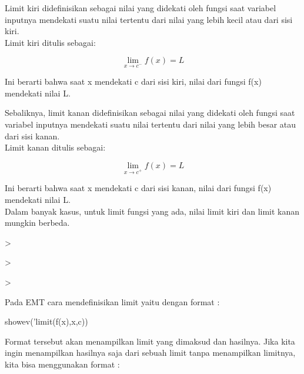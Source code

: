 \documentclass[a4paper,10pt]{article}
\begin{document}
\begin{eulernotebook}
\begin{eulercomment}
\begin{eulercomment}
\begin{eulercomment}
\begin{eulercomment}
\begin{eulercomment}
\begin{eulercomment}
\begin{eulercomment}
Limit kiri didefinisikan sebagai nilai yang didekati oleh fungsi saat
variabel inputnya mendekati suatu nilai tertentu dari nilai yang lebih
kecil atau dari sisi kiri.\\
Limit kiri ditulis sebagai:

\end{eulercomment}
\begin{eulerformula}
\[
\lim \limits_{x \to c^-} {f(x)} = L
\]
\end{eulerformula}
\begin{eulercomment}
Ini berarti bahwa saat x mendekati c dari sisi kiri, nilai dari fungsi
f(x) mendekati nilai L.


Sebaliknya, limit kanan didefinisikan sebagai nilai yang didekati oleh
fungsi saat variabel inputnya mendekati suatu nilai tertentu dari
nilai yang lebih besar atau dari sisi kanan.\\
Limit kanan ditulis sebagai:

\end{eulercomment}
\begin{eulerformula}
\[
\lim \limits_{x \to c^+} {f(x)} = L
\]
\end{eulerformula}
\begin{eulercomment}
Ini berarti bahwa saat x mendekati c dari sisi kanan, nilai dari
fungsi f(x) mendekati nilai L.\\
Dalam banyak kasus, untuk limit fungsi yang ada, nilai limit kiri dan
limit kanan mungkin berbeda.
\end{eulercomment}
\begin{eulerprompt}
>                        
\end{eulerprompt}
\begin{eulerudf}
   
\end{eulerudf}
\begin{eulerprompt}
>    
\end{eulerprompt}
\begin{eulerudf}
   
\end{eulerudf}
\begin{eulerprompt}
> 
\end{eulerprompt}
\begin{eulercomment}
Pada EMT cara mendefinisikan limit yaitu dengan format :

\textdollar{}showev('limit(f(x),x,c))

Format tersebut akan menampilkan limit yang dimaksud dan hasilnya.
Jika kita ingin menampilkan hasilnya saja dari sebuah limit tanpa
menampilkan limitnya, kita bisa menggunakan format :


\end{eulercomment}
\end{eulercomment}
\end{eulercomment}
\end{eulercomment}
\end{eulercomment}
\end{eulercomment}
\end{eulercomment}
\end{eulernotebook}
\end{document}
